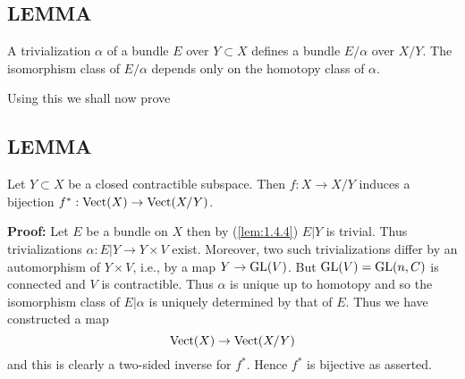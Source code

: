 \subsection{LEMMA} A trivialization $\alpha$ of a bundle $E$ over $Y \subset X$ defines a bundle $E/\alpha$ over $X/Y$. The isomorphism class of $E/\alpha$ depends only on the homotopy class of $\alpha$. \par 

Using this we shall now prove \par

\subsection{LEMMA} Let $Y \subset X$ be a closed contractible subspace. Then $f: X \to X/Y$ induces a bijection $f^*: \operatorname{Vect}(X) \to \operatorname{Vect}(X/Y)$. \par 

\textbf{Proof:} Let $E$ be a bundle on $X$ then by (\ref{lem:1.4.4}) $E \vert Y$ is trivial. Thus trivializations $\alpha: E \vert Y \to Y \times V$ exist. Moreover, two such trivializations differ by an automorphism of $Y \times V$, i.e., by a map $Y \to \operatorname{GL}(V)$. But $\operatorname{GL}(V) = \operatorname{GL}(n,C)$ is connected and $V$ is contractible. Thus $\alpha$ is unique up to homotopy and so the isomorphism class of $E \vert \alpha$ is uniquely determined by that of $E$. Thus we have constructed a map
\begin{equation}
    \operatorname{Vect}(X) \to \operatorname{Vect}(X/Y)
\end{equation}
and this is clearly a two-sided inverse for $f^*$. Hence $f^*$ is bijective as asserted. \par 

